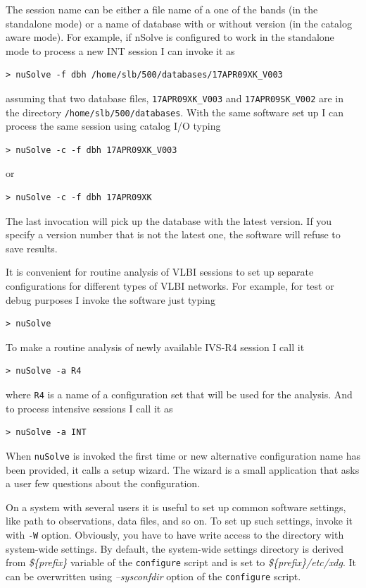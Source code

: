 \documentclass [10pt,letterpaper]{report}
\newcommand{\nuSolve}{\greektext n\latintext Solve}
\begin{document}
{The session name can be either a file name of a one of the bands (in the
standalone mode) or a name of database with or without version (in the
catalog aware mode). For example, if \nuSolve{} is configured to work
in the standalone mode to process a new INT session I can invoke it as
\begin{verbatim}
> nuSolve -f dbh /home/slb/500/databases/17APR09XK_V003
\end{verbatim}
\noindent
assuming that two database files, {\tt 17APR09XK\_V003} and {\tt 17APR09SK\_V002}
are in the directory {\tt /home/slb/500/databases}. With the same software
set up I can process the same session using catalog I/O typing
\begin{verbatim}
> nuSolve -c -f dbh 17APR09XK_V003
\end{verbatim}
\noindent
or
\begin{verbatim}
> nuSolve -c -f dbh 17APR09XK
\end{verbatim}
\noindent
The last invocation will pick up the database with the latest version. If
you specify a version number that is not the latest one, the software will
refuse to save results.

It is convenient for routine analysis of VLBI sessions to set up separate
configurations for different types of VLBI networks. For example, for
test or debug purposes I invoke the software just typing
\begin{verbatim}
> nuSolve
\end{verbatim}
\noindent
To make a routine analysis of newly available IVS-R4 session I call it
\begin{verbatim}
> nuSolve -a R4
\end{verbatim}
\noindent
where {\tt R4} is a name of a configuration set that will be used for the
analysis. And to process intensive sessions I call it as
\begin{verbatim}
> nuSolve -a INT
\end{verbatim}
\noindent

When {\tt nuSolve} is invoked the first time or new alternative
configuration name has been provided, it calls a setup wizard. The
wizard is a small application that asks a user few questions about the
configuration.

On a system with several users it is useful to set up common software settings,
like path to observations, data files, and so on. To set up such settings, invoke
it with {\tt -W} option. Obviously, you have to have write access to the
directory with system-wide settings. By default, the system-wide settings directory
is derived from {\sl \$\{prefix\}} variable of the {\tt configure} script and is
set to {\sl \$\{prefix\}/etc/xdg}. It can be overwritten using {\sl --sysconfdir}
option of the {\tt configure} script.

}
\end{document}
